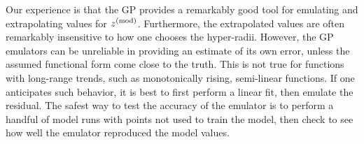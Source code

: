 Our experience is that the GP provides a remarkably good tool for emulating and extrapolating values for $z^{\rm(mod)}$. Furthermore, the extrapolated values are often remarkably insensitive to how one chooses the hyper-radii. However, the GP emulators can be unreliable in providing an estimate of its own error, unless the assumed functional form come close to the truth. This is not true for functions with long-range trends, such as monotonically rising, semi-linear functions. If one anticipates such behavior, it is best to first perform a linear fit, then emulate the residual. The safest way to test the accuracy of the emulator is to perform a handful of model runs with points not used to train the model, then check to see how well the emulator reproduced the model values.






